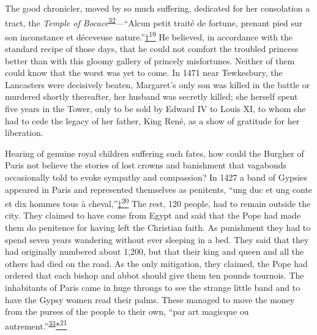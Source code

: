 The good chronicler, moved by so much suffering, dedicated for her
consolation a tract, the \emph{Temple of
Bocace}\textsuperscript{\protect\hypertarget{08_Chapter_One__THE_PASSIONATE_INTE.xhtmlux5cux23id_2167}{\protect\hyperlink{23_NOTES.xhtmlux5cux23id_2168}{32}}}---``Alcun
petit traité de fortune, prenant pied sur son inconstance et déceveuse
nature.''\protect\hypertarget{08_Chapter_One__THE_PASSIONATE_INTE.xhtmlux5cux23id_2281}{\protect\hyperlink{23_NOTES.xhtmlux5cux23id_2285}{†\textsuperscript{19}}}
He believed, in accordance with the standard recipe of those days, that
he could not comfort the troubled princess better than with this gloomy
gallery of princely misfortunes. Neither of them could know that the
worst was yet to come. In 1471 near Tewkesbury, the Lancasters were
decisively beaten, Margaret's only son was killed in the battle or
murdered shortly thereafter, her husband was secretly killed; she
herself spent five years in the Tower, only to be sold by Edward IV to
Louis XI, to whom she had to cede the legacy of her father, King René,
as a show of gratitude for her liberation.

Hearing of genuine royal children suffering such fates, how could the
Burgher of Paris not believe the stories of lost crowns and banishment
that vagabonds occasionally told to evoke sympathy and compassion? In
1427 a band of Gypsies appeared in Paris and represented themselves as
penitents, ``ung duc et ung conte et dix hommes tous à
cheval,''\protect\hypertarget{08_Chapter_One__THE_PASSIONATE_INTE.xhtmlux5cux23id_2284}{\protect\hyperlink{23_NOTES.xhtmlux5cux23id_2289}{‡\textsuperscript{20}}}
The rest, 120 people, had to remain outside the city. They claimed to
have come from Egypt and said that the Pope had made them do penitence
for having left the
Chris\protect\hypertarget{08_Chapter_One__THE_PASSIONATE_INTE.xhtmlux5cux23page_15}{}{}tian
faith. As punishment they had to spend seven years wandering without
ever sleeping in a bed. They said that they had originally numbered
about 1,200, but that their king and queen and all the others had died
on the road. As the only mitigation, they claimed, the Pope had ordered
that each bishop and abbot should give them ten pounds tournois. The
inhabitants of Paris came in huge throngs to see the strange little band
and to have the Gypsy women read their palms. These managed to move the
money from the purses of the people to their own, ``par art magicque ou
autrement.''\textsuperscript{\protect\hypertarget{08_Chapter_One__THE_PASSIONATE_INTE.xhtmlux5cux23id_2165}{\protect\hyperlink{23_NOTES.xhtmlux5cux23id_2166}{33}}}\protect\hypertarget{08_Chapter_One__THE_PASSIONATE_INTE.xhtmlux5cux23id_2288}{\protect\hyperlink{23_NOTES.xhtmlux5cux23id_2287}{*\textsuperscript{21}}}

